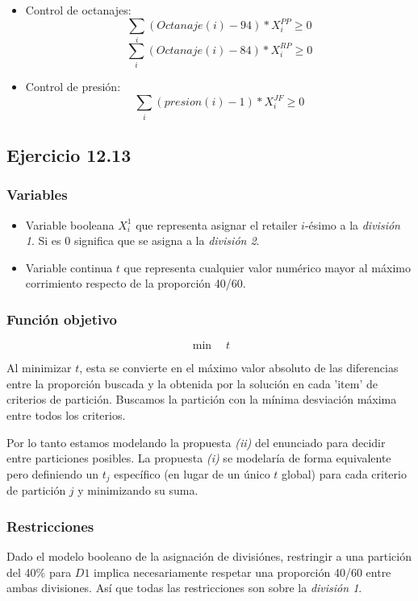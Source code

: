 \begin{itemize}
        \item Control de octanajes:
        $$ \sum_i (Octanaje(i)-94)*X^{PP}_i \geq 0 $$
        $$ \sum_i (Octanaje(i)-84)*X^{RP}_i \geq 0 $$

        \item Control de presión:
        $$ \sum_i (presion(i)-1)*X^{JF}_i \geq 0  $$
    \end{itemize}

\subsection{Ejercicio 12.13}

\subsubsection{Variables}
\begin{itemize}
    \item Variable booleana $X^1_i$ que representa asignar el retailer $i$-ésimo a la \emph{división 1}. Si es 0 significa que se asigna a la \emph{división 2}.
    \item Variable continua $t$ que representa cualquier valor numérico mayor al máximo corrimiento respecto de la proporción 40/60.
\end{itemize}
\subsubsection{Función objetivo}
$$ \min \quad t $$

Al minimizar $t$, esta se convierte en el máximo valor absoluto de las diferencias entre la proporción buscada y la obtenida por la solución en cada 'item' de criterios de partición. Buscamos la partición con la mínima desviación máxima entre todos los criterios.

Por lo tanto estamos modelando la propuesta \emph{(ii)} del enunciado para decidir entre particiones posibles. La propuesta \emph{(i)} se modelaría de forma equivalente pero definiendo un $t_j$ específico (en lugar de un único $t$ global) para cada criterio de partición $j$ y minimizando su suma.

\subsubsection{Restricciones}
Dado el modelo booleano de la asignación de divisiónes, restringir a una partición del 40\% para $D1$ implica necesariamente respetar una proporción 40/60 entre ambas divisiones. Así que todas las restricciones son sobre la \emph{división 1}.


